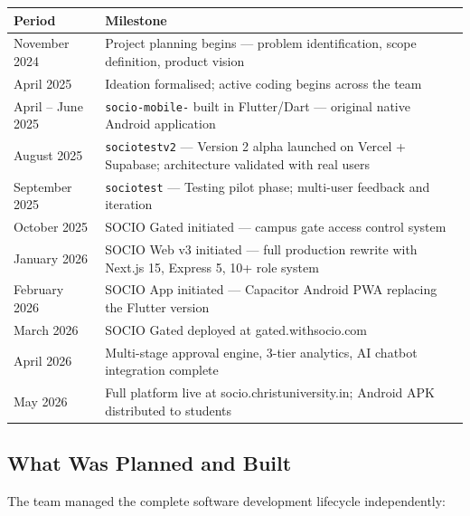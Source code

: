 \documentclass[12pt,a4paper]{article}
\begin{document}
\begin{tabularx}{\textwidth}{L{3.2cm} X}
\toprule
{}
\textbf{Period} & \textbf{Milestone} \\
\midrule
November 2024 & Project planning begins — problem identification, scope definition, product vision \\
April 2025 & Ideation formalised; active coding begins across the team \\
April -- June 2025 & \texttt{socio-mobile-} built in Flutter/Dart — original native Android application \\
August 2025 & \texttt{sociotestv2} — Version 2 alpha launched on Vercel + Supabase; architecture validated with real users \\
September 2025 & \texttt{sociotest} — Testing pilot phase; multi-user feedback and iteration \\
October 2025 & SOCIO Gated initiated — campus gate access control system \\
January 2026 & SOCIO Web v3 initiated — full production rewrite with Next.js 15, Express 5, 10+ role system \\
February 2026 & SOCIO App initiated — Capacitor Android PWA replacing the Flutter version \\
March 2026 & SOCIO Gated deployed at gated.withsocio.com \\
April 2026 & Multi-stage approval engine, 3-tier analytics, AI chatbot integration complete \\
May 2026 & Full platform live at socio.christuniversity.in; Android APK distributed to students \\
\bottomrule
\end{tabularx}

\subsection{What Was Planned and Built}

The team managed the complete software development lifecycle independently:
\end{document}
